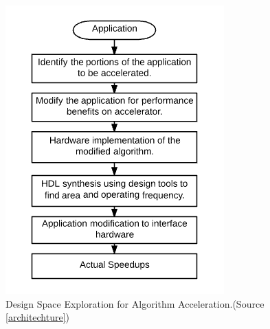 \begin{figure}[!h]
\centering
\includegraphics[scale=0.65]{figures/DSE.png}
\caption{Design Space Exploration for Algorithm Acceleration.(Source \ref{architechture})}
\label{fig:DSE}
\end{figure}